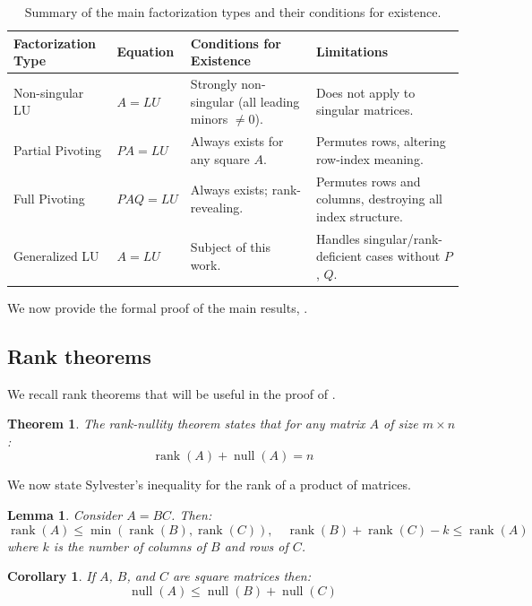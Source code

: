 \documentclass{article}
\DeclareMathOperator{\rk}{rank}
\DeclareMathOperator{\nl}{null}
\newtheorem{theorem}{Theorem}[section]
\newtheorem{lemma}{Lemma}[section]
\newtheorem{corollary}{Corollary}[section]
\begin{document}
\begin{table}[htbp]
    \centering
    \begin{tabular}{llp{4cm}p{6cm}}
        \toprule
        Factorization Type & Equation & Conditions for Existence & Limitations \\
        \midrule
        Non-singular LU & $A=LU$ & Strongly non-singular (all leading minors $\neq 0$). & Does not apply to singular matrices. \\
        Partial Pivoting & $PA=LU$ & \raggedright Always exists for any square $A$. & \raggedright Permutes rows, altering row-index meaning.\tabularnewline
        Full Pivoting & $PAQ=LU$ & \raggedright Always exists; rank-revealing. & \raggedright Permutes rows and columns, destroying all index structure.\tabularnewline
        Generalized LU & $A=LU$ & Subject of this work. & \raggedright Handles singular/rank-deficient cases without $P$, $Q$.\tabularnewline
        \bottomrule
    \end{tabular}
    \caption{Summary of the main factorization types and their conditions for existence.}\label{tab:main}
\end{table}

We now provide the formal proof of the main results, .

\subsection{Rank theorems}

We recall rank theorems that will be useful in the proof of .

\begin{theorem}\label{thm:rank-nullity}
    The rank-nullity theorem states that for any matrix $A$ of size $m \times n$:
    \[
        \rk(A) + \nl(A) = n
    \]
\end{theorem}

We now state Sylvester's inequality for the rank of a product of matrices.

\begin{lemma}\label{lem:rank}
    Consider $A = BC$. Then:
    \[
        \rk(A) \le \min(\rk(B), \rk(C)), \quad
        \rk(B) + \rk(C) - k \le \rk(A)
    \]
    where $k$ is the number of columns of $B$ and rows of $C$.
\end{lemma}

\begin{corollary}\label{cor:nullity}
    If $A$, $B$, and $C$ are square matrices then:
    \[
        \nl(A) \le \nl(B) + \nl(C)
    \]
\end{corollary}
\end{document}
